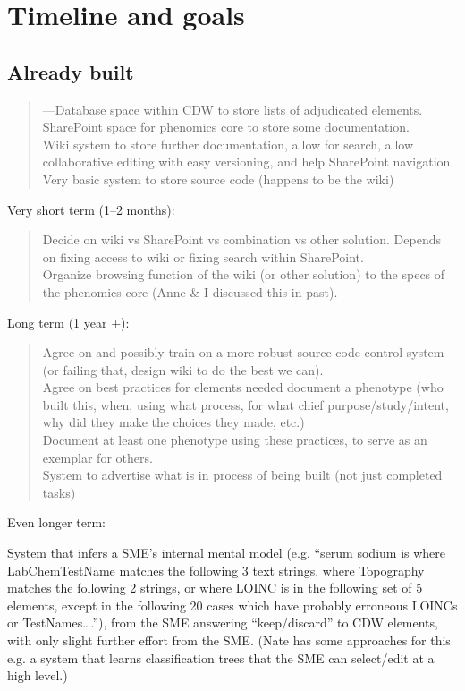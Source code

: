 \documentclass{tufte-handout}
\begin{document}
\section{Timeline and goals}

\subsection{Already built}

\begin{quote}
---Database space within CDW to store lists of adjudicated elements.\\
SharePoint space for phenomics core to store some documentation.\\
Wiki system to store further documentation, allow for search, allow collaborative editing with easy versioning, and help SharePoint navigation.\\
Very basic system to store source code (happens to be the wiki)
\end{quote}

\noindent Very short term (1--2 months):

\begin{quote}
Decide on wiki vs SharePoint vs combination vs other solution. Depends on fixing access to wiki or fixing search within SharePoint.\\
Organize browsing function of the wiki (or other solution) to the specs of the phenomics core (Anne \& I discussed this in past).
\end{quote}

Long term (1 year +):
\begin{quote}
Agree on and possibly train on a more robust source code control system (or failing that, design wiki to do the best we can).\\
Agree on best practices for elements needed document a phenotype (who built this, when, using what process, for what chief purpose/study/intent, why did they make the choices they made, etc.)\\
Document at least one phenotype using these practices, to serve as an exemplar for others.\\
System to advertise what is in process of being built (not just completed tasks)
\end{quote}

Even longer term:

System that infers a SME's internal mental model (e.g. ``serum sodium is where LabChemTestName matches the following 3 text strings, where Topography matches the following 2 strings, or where LOINC is in the following set of 5 elements, except in the following 20 cases which have probably erroneous LOINCs or TestNames\ldots{}.''), from the SME answering ``keep/discard'' to CDW elements, with only slight further effort from the SME. (Nate has some approaches for this e.g. a system that learns classification trees that the SME can select/edit at a high level.)
\end{document}
